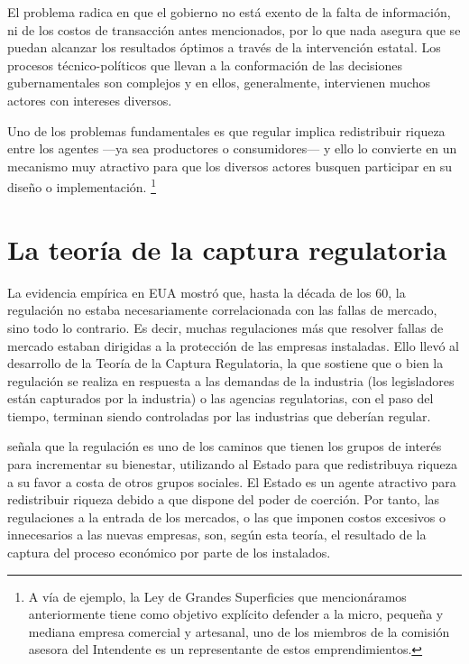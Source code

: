 \documentclass[
  12pt,
  spanish,
]{book}
\begin{document}
El problema radica en que el gobierno no está exento de la falta de información, ni de los costos de transacción antes mencionados, por lo que nada asegura que se puedan alcanzar los resultados óptimos a través de la intervención estatal. Los procesos técnico-políticos que llevan a la conformación de las decisiones gubernamentales son complejos y en ellos, generalmente, intervienen muchos actores con intereses diversos.

Uno de los problemas fundamentales es que regular implica redistribuir riqueza entre los agentes ---ya sea productores o consumidores--- y ello lo convierte en un mecanismo muy atractivo para que los diversos actores busquen participar en su diseño o implementación.
\footnote{A vía de ejemplo, la Ley de Grandes Superficies que mencionáramos anteriormente tiene como objetivo explícito defender a la micro, pequeña y mediana empresa comercial y artesanal, uno de los miembros de la comisión asesora del Intendente es un representante de estos emprendimientos.}

\hypertarget{la-teoruxeda-de-la-captura-regulatoria}{%
\section{La teoría de la captura regulatoria}\label{la-teoruxeda-de-la-captura-regulatoria}}

La evidencia empírica en EUA mostró que, hasta la década de los 60, la regulación no estaba necesariamente correlacionada con las fallas de mercado, sino todo lo contrario. Es decir, muchas regulaciones más que resolver fallas de mercado estaban dirigidas a la protección de las empresas instaladas. Ello llevó al desarrollo de la Teoría de la Captura Regulatoria, la que sostiene que o bien la regulación se realiza en respuesta a las demandas de la industria (los legisladores están capturados por la industria) o las agencias regulatorias, con el paso del tiempo, terminan siendo controladas por las industrias que deberían regular.

\citet{Stigler1971} señala que la regulación es uno de los caminos que tienen los grupos de interés para incrementar su bienestar, utilizando al Estado para que redistribuya riqueza a su favor a costa de otros grupos sociales. El Estado es un agente atractivo para redistribuir riqueza debido a que dispone del poder de coerción. Por tanto, las regulaciones a la entrada de los mercados, o las que imponen costos excesivos o innecesarios a las nuevas empresas, son, según esta teoría, el resultado de la captura del proceso económico por parte de los instalados.
\end{document}
